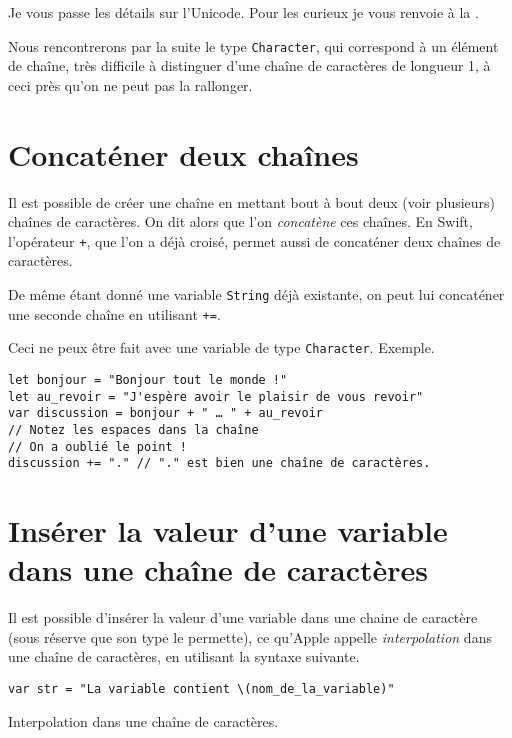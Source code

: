 Je vous passe les détails sur l'Unicode. Pour les curieux je vous renvoie à la .

Nous rencontrerons par la suite le type \texttt{Character}, qui correspond à un élément de chaîne, très difficile à distinguer d'une chaîne de caractères de longueur 1, à ceci près qu'on ne peut pas la rallonger.
\section{Concaténer deux chaînes}
Il est possible de créer une chaîne en mettant bout à bout deux (voir plusieurs) chaînes de caractères. On dit alors que l'on \emph{concatène} ces chaînes. En Swift, l'opérateur \verb"+", que l'on a déjà croisé, permet aussi de concaténer deux chaînes de caractères.

De même étant donné une variable \texttt{String} déjà existante, on peut lui concaténer une seconde chaîne en utilisant \verb"+=".

Ceci ne peux être fait avec une variable de type \texttt{Character}. Exemple.

\begin{listing}[h]
\begin{verbatim}
let bonjour = "Bonjour tout le monde !"
let au_revoir = "J'espère avoir le plaisir de vous revoir"
var discussion = bonjour + " … " + au_revoir
// Notez les espaces dans la chaîne
// On a oublié le point !
discussion += "." // "." est bien une chaîne de caractères.
\end{verbatim}
\end{listing}
\section{Insérer la valeur d'une variable dans une chaîne de caractères}
Il est possible d'insérer la valeur d'une variable dans une chaine de caractère (sous réserve que son type le permette), ce qu'Apple appelle \emph{interpolation} dans une chaîne de caractères, en utilisant la syntaxe suivante.
\begin{listing}[h]
\begin{verbatim}
var str = "La variable contient \(nom_de_la_variable)"
\end{verbatim}
\caption{Interpolation dans une chaîne de caractères.}
\end{listing}%


